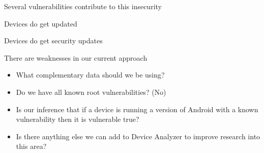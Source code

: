 \documentclass{beamer}
\begin{document}
\begin{frame}{Several vulnerabilities contribute to this insecurity}{}
 \begin{center}
  \vspace{-0.5em}
 \end{center}
\end{frame}

\begin{frame}{Devices do get updated}{}
 \begin{center}
  \vspace{-0.5em}
 \end{center}
\end{frame}

\begin{frame}{Devices do get security updates}{}
 \begin{center}
  \vspace{-0.5em}
 \end{center}
\end{frame}

\begin{frame}{There are weaknesses in our current approach}{}
 \begin{itemize}
  \item What complementary data should we be using?
  \item Do we have all known root vulnerabilities? (No)
  \item Is our inference that if a device is running a version of Android with a known vulnerability then it is vulnerable true?
  \item Is there anything else we can add to Device Analyzer to improve research into this area?
 \end{itemize}
\end{frame}
\end{document}
